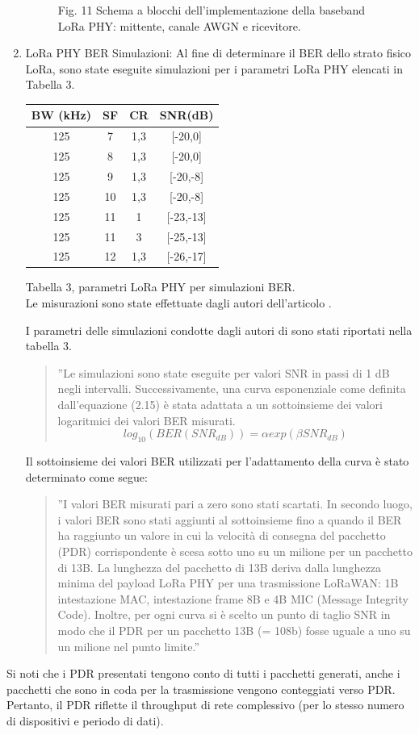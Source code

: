 \documentclass[a4paper]{report} %
\begin{document}
\begin{enumerate}
\begin{figure}
Fig. 11 Schema a blocchi dell'implementazione della baseband LoRa PHY: mittente, canale AWGN e ricevitore.
\end{figure}
\item LoRa PHY BER Simulazioni:  
Al fine di determinare il BER dello strato fisico LoRa, sono state eseguite simulazioni per i parametri LoRa PHY elencati in Tabella 3. 
\begin{center}

\begin{tabular}{|c|c|c|c}
BW (kHz)&SF&CR&SNR(dB)\\ \hline
125&7&1,3&[-20,0]\\ \hline
125&8&1,3&[-20,0]\\ \hline
125&9&1,3&[-20,-8]\\ \hline
125&10&1,3&[-20,-8]\\ \hline
125&11&1&[-23,-13]\\ \hline
125&11&3&[-25,-13]\\ \hline
125&12&1,3&[-26,-17]\\ \hline
\end{tabular}
Tabella 3, parametri LoRa PHY per simulazioni BER. \\
Le misurazioni sono state effettuate dagli autori dell'articolo \cite{art:rif.49}. \\
\end{center}


I parametri delle simulazioni condotte dagli autori di \cite{art:rif.49} sono stati riportati nella tabella 3.
\begin{quote}
	''Le simulazioni sono state eseguite per valori SNR in passi di 1 dB negli intervalli. Successivamente, una curva esponenziale come definita dall'equazione (2.15) è stata adattata a un sottoinsieme dei valori logaritmici dei valori BER misurati.
	\begin{equation}
	log_{10}(BER (SNR_{dB})) = \alpha exp (\beta SNR_{dB})
	\end{equation}
\end{quote}
Il sottoinsieme dei valori BER utilizzati per l'adattamento della curva è stato determinato come segue:
\begin{quote}
	''I valori BER misurati pari a zero sono stati scartati. In secondo luogo, i valori BER sono stati aggiunti al sottoinsieme fino a quando il BER ha raggiunto un valore in cui la velocità di consegna del pacchetto (PDR) corrispondente è scesa sotto uno su un milione per un pacchetto di 13B. La lunghezza del pacchetto di 13B deriva dalla lunghezza minima del payload LoRa PHY per una trasmissione LoRaWAN: 1B intestazione MAC, intestazione frame 8B e 4B MIC (Message Integrity Code). Inoltre, per ogni curva si è scelto un punto di taglio SNR in modo che il PDR per un pacchetto 13B (= 108b) fosse uguale a uno su un milione nel punto limite.''
\end{quote}
\end{enumerate}
Si noti che i PDR presentati tengono conto di tutti i pacchetti generati, anche i pacchetti che sono in coda per la trasmissione vengono conteggiati verso PDR. Pertanto, il PDR riflette il throughput di rete complessivo (per lo stesso numero di dispositivi e periodo di dati).
\end{document}
